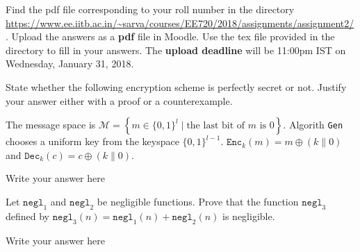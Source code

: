 \documentclass[12pt,a4paper,answers]{exam}
\begin{document}
\pagestyle{head}
\headrule
{}
%

\extraheadheight{.4in}%
\extrafootheight{-0.5in}%
\extrawidth{0.5in}%

Find the pdf file corresponding to your roll number in the directory \url{https://www.ee.iitb.ac.in/~sarva/courses/EE720/2018/assignments/assignment2/}. Upload the answers as a \textbf{pdf} file in Moodle. Use the tex file provided in the directory to fill in your answers. The \textbf{upload deadline} will be 11:00pm IST on Wednesday, January 31, 2018.
\begin{questions}
\question[5] State whether the following encryption scheme is perfectly secret or not. Justify your answer either with a proof or a counterexample.

  The message space is $\mathcal{M} = \left\{ m \in \{0,1\}^l \mid \textrm{the last bit of $m$ is 0} \right\}$. Algorith \texttt{Gen} chooses a uniform key from the keyspace $\{0,1\}^{l-1}$. $\texttt{Enc}_k(m) = m \oplus (k \| 0)$ and $\texttt{Dec}_k(c) = c \oplus (k \| 0)$.
  \begin{solution}
    Write your answer here
  \end{solution}

  \question[5] Let $\texttt{negl}_1$ and $\texttt{negl}_2$ be negligible functions. Prove that the function $\texttt{negl}_3$ defined by $\texttt{negl}_3(n) = \texttt{negl}_1(n) + \texttt{negl}_2(n)$ is negligible.
  \begin{solution}
    Write your answer here
  \end{solution}

  
\end{questions}
\end{document}
